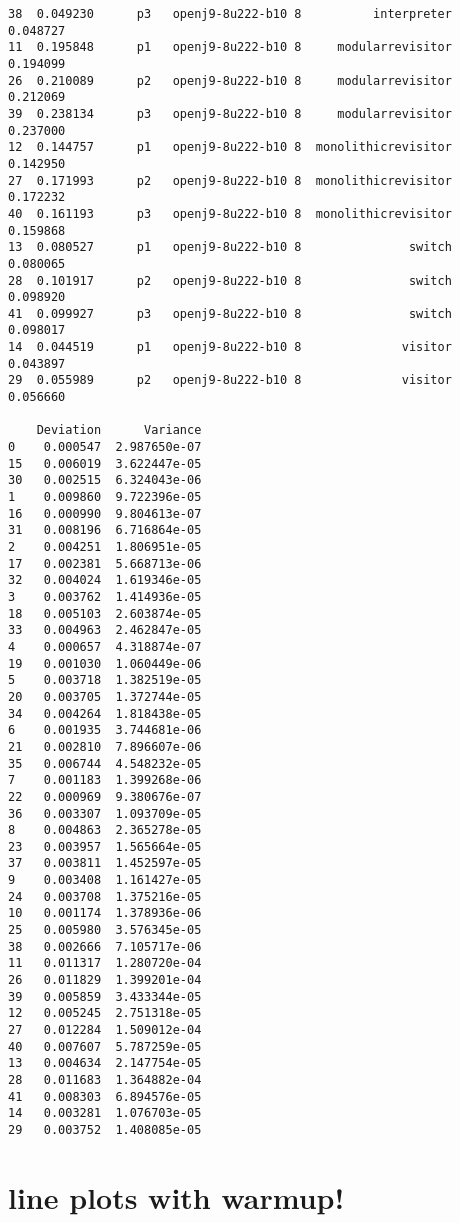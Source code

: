 \documentclass[11pt]{article}
\begin{document}
\begin{tcolorbox}[breakable, boxrule=.5pt, size=fbox, pad at break*=1mm, opacityfill=0]
\begin{Verbatim}[commandchars=\\\{\}]
38  0.049230      p3   openj9-8u222-b10 8          interpreter  0.048727
11  0.195848      p1   openj9-8u222-b10 8     modularrevisitor  0.194099
26  0.210089      p2   openj9-8u222-b10 8     modularrevisitor  0.212069
39  0.238134      p3   openj9-8u222-b10 8     modularrevisitor  0.237000
12  0.144757      p1   openj9-8u222-b10 8  monolithicrevisitor  0.142950
27  0.171993      p2   openj9-8u222-b10 8  monolithicrevisitor  0.172232
40  0.161193      p3   openj9-8u222-b10 8  monolithicrevisitor  0.159868
13  0.080527      p1   openj9-8u222-b10 8               switch  0.080065
28  0.101917      p2   openj9-8u222-b10 8               switch  0.098920
41  0.099927      p3   openj9-8u222-b10 8               switch  0.098017
14  0.044519      p1   openj9-8u222-b10 8              visitor  0.043897
29  0.055989      p2   openj9-8u222-b10 8              visitor  0.056660

    Deviation      Variance
0    0.000547  2.987650e-07
15   0.006019  3.622447e-05
30   0.002515  6.324043e-06
1    0.009860  9.722396e-05
16   0.000990  9.804613e-07
31   0.008196  6.716864e-05
2    0.004251  1.806951e-05
17   0.002381  5.668713e-06
32   0.004024  1.619346e-05
3    0.003762  1.414936e-05
18   0.005103  2.603874e-05
33   0.004963  2.462847e-05
4    0.000657  4.318874e-07
19   0.001030  1.060449e-06
5    0.003718  1.382519e-05
20   0.003705  1.372744e-05
34   0.004264  1.818438e-05
6    0.001935  3.744681e-06
21   0.002810  7.896607e-06
35   0.006744  4.548232e-05
7    0.001183  1.399268e-06
22   0.000969  9.380676e-07
36   0.003307  1.093709e-05
8    0.004863  2.365278e-05
23   0.003957  1.565664e-05
37   0.003811  1.452597e-05
9    0.003408  1.161427e-05
24   0.003708  1.375216e-05
10   0.001174  1.378936e-06
25   0.005980  3.576345e-05
38   0.002666  7.105717e-06
11   0.011317  1.280720e-04
26   0.011829  1.399201e-04
39   0.005859  3.433344e-05
12   0.005245  2.751318e-05
27   0.012284  1.509012e-04
40   0.007607  5.787259e-05
13   0.004634  2.147754e-05
28   0.011683  1.364882e-04
41   0.008303  6.894576e-05
14   0.003281  1.076703e-05
29   0.003752  1.408085e-05
\end{Verbatim}
\end{tcolorbox}
        
    \hypertarget{line-plots-with-warmup}{%
\section{line plots with warmup!}\label{line-plots-with-warmup}}
\end{document}
